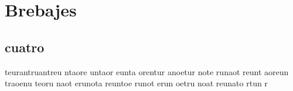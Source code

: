 




\chapter{Brebajes}


\section{cuatro}

teurantruantreu ntaore untaor eunta orentur anoetur note runaot reunt aoreun traoenu teoru naot erunota reuntoe runot erun oetru noat reunato rtun r










